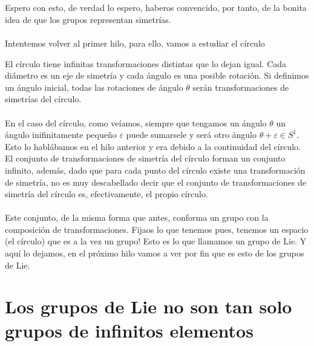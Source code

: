 \documentclass[12pt]{article}
\begin{document}
\\\\ Espero con esto, de verdad lo espero, haberos convencido, por tanto, de la bonita idea de que los grupos representan simetrías. 
\\\\
Intentemos volver al primer hilo, para ello, vamos a estudiar el círculo 

\begin{center}
\end{center} 
 El círculo tiene infinitas transformaciones distintas que lo dejan igual. Cada diámetro es un eje de simetría y cada ángulo es una posible rotación. Si definimos un ángulo inicial, todas las rotaciones de ángulo $\theta$ serán transformaciones de simetrías del círculo.\\\\
En el caso del círculo, como veíamos, siempre que tengamos un ángulo $\theta$ un ángulo inifinitamente pequeño $\varepsilon$  puede sumarsele y será otro ángulo $\theta +\varepsilon \in S^1$. Esto lo hablábamos en el hilo anterior y era debido a la continuidad del círculo. El conjunto de transformaciones de simetría del círculo forman un conjunto infinito, además, dado que para cada punto del círculo existe una transformación de simetría, no es muy descabellado decir que el conjunto de transformaciones de simetría del círculo es, efectivamente, el propio círculo. \\\\
Este conjunto, de la misma forma que antes, conforma un grupo con la composición de transformaciones. Fijaos lo que tenemos pues, tenemos un espacio (el círculo) que es a la vez un grupo! Esto es lo que llamamos un grupo de Lie. Y aquí lo dejamos, en el próximo hilo vamos a ver por fin que es esto de los grupos de Lie. 
\section{Los grupos de Lie no son tan solo grupos de infinitos elementos}
\end{document}
